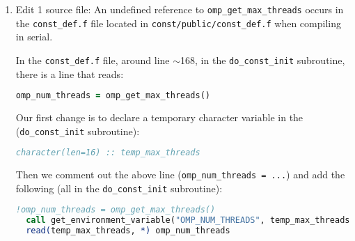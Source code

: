 \begin{enumerate}
%
%
%
%
%
%
%

%
\item Edit 1 source file: An undefined reference to 
{\tt omp\_get\_max\_threads} occurs in the {\tt const\_def.f} file located in 
{\tt const/public/const\_def.f} when compiling in serial.

In the {\tt const\_def.f} file, around line $\sim$168, in the 
{\tt do\_const\_init} subroutine, there is a line that reads:
\begin{lstlisting}[language=fortran,mathescape=false]
  omp_num_threads = omp_get_max_threads()
\end{lstlisting}
Our first change is to declare a temporary character variable in the 
({\tt do\_const\_init} subroutine):
\begin{lstlisting}[language=fortran,mathescape=false]
  character(len=16) :: temp_max_threads
\end{lstlisting}
Then we comment out the above line ({\tt omp\_num\_threads = ...}) and add the 
following (all in the {\tt do\_const\_init} subroutine):
\begin{lstlisting}[language=fortran,mathescape=false]
  !omp_num_threads = omp_get_max_threads()
  call get_environment_variable("OMP_NUM_THREADS", temp_max_threads)
  read(temp_max_threads, *) omp_num_threads
\end{lstlisting}

\end{enumerate}


